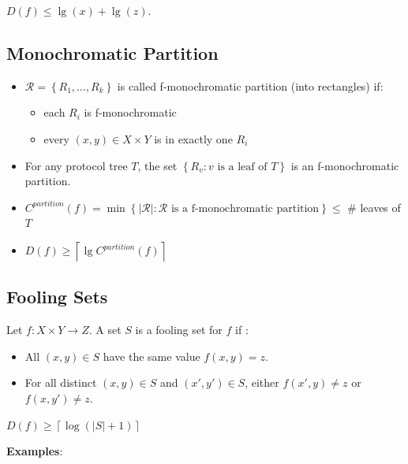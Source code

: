 \documentclass[10pt,landscape,a4paper]{article}
\newcommand{\set}[1]{\left \{ #1 \right \}}
\newcommand{\abs}[1]{\left | #1 \right |}
\newcommand{\ceil}[1]{\left \lceil #1 \right \rceil}
\begin{document}
\begin{multicols*}{3}
$D(f) \leq \lg(x) + \lg(z)$.

\subsection{Monochromatic Partition}

\begin{itemize}
    \item $\mathcal{R} = \set{R_1, \ldots, R_k}$ is called f-monochromatic partition (into rectangles) if:
    \begin{itemize}
        \item each $R_i$ is f-monochromatic
        \item every $(x, y) \in X \times Y$ is in exactly one $R_i$
    \end{itemize}
    \item For any protocol tree $T$, the set $\set{R_v: v \text{ is a leaf of } T}$ is an f-monochromatic partition.
    \item $C^{partition} (f) = \min \set{\abs{\mathcal{R}}: \mathcal{R} \text{ is a f-monochromatic partition}} \leq $ \# leaves of $T$
    \item $D(f) \geq \ceil{\lg{C^{partition} (f)}}$
\end{itemize}

\subsection{Fooling Sets}

Let $f: X \times Y \rightarrow Z$. A set $S$ is a fooling set for $f$ if :

\begin{itemize}
    \item All $(x, y) \in S$ have the same value $f(x, y) = z$.
    \item For all distinct $(x, y) \in S$ and $(x', y') \in S$, either $f(x', y) \neq z$ or $f(x, y') \neq z$.
\end{itemize}

$D(f) \geq \ceil{\log(\abs{S} + 1)}$

\textbf{Examples}:


\end{multicols*}
\end{document}
